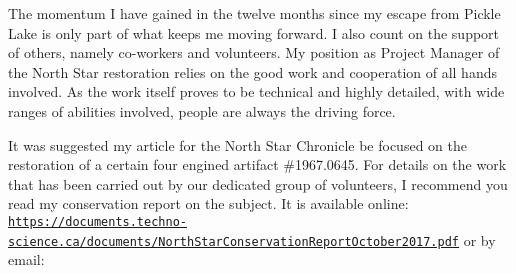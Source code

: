 The momentum I have gained in the twelve months since my escape from
Pickle Lake is only part of what keeps me moving forward. I also count
on the support of others, namely co-workers and volunteers. My position
as Project Manager of the North Star restoration relies on the good
work and cooperation of all hands involved. As the work itself proves
to be technical and highly detailed, with wide ranges of abilities
involved, people are always the driving force.

It was suggested my article for the North Star Chronicle be focused on
the restoration of a certain four engined artifact \#1967.0645. For
details on the work that has been carried out by our dedicated group of
volunteers, I recommend you read my conservation report on the subject.
It is available online: \textcolor{blue}{\texttt{\url{https://documents.techno-science.ca/documents/NorthStarConservationReportOctober2017.pdf}}}
or by email: \textcolor{blue}{}


